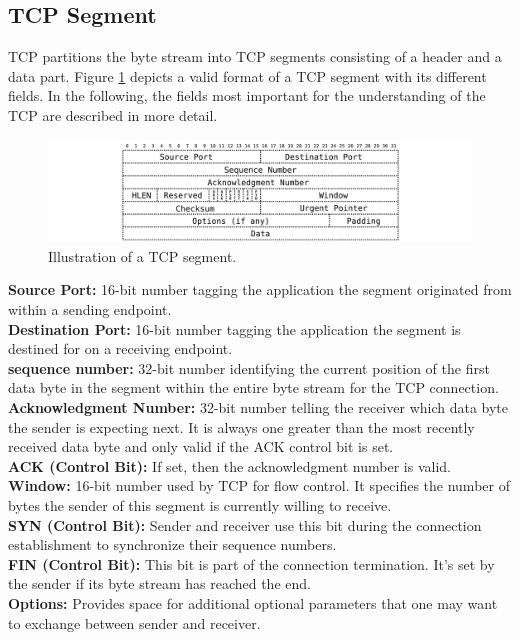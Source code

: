 \subsection*{TCP Segment}

TCP partitions the byte stream into TCP segments consisting of a header and a data part. Figure \ref{fig:TCPSegment} depicts a valid format of a TCP segment with its different fields. In the following, the fields most important for the understanding of the TCP are described in more detail. 

\begin{figure} [H]
	\begin{center}
		\def\svgwidth{1\textwidth}
		\includegraphics[scale=0.2]{../illustrations/importantConcepts/TCPSegment.pdf}  
		\caption[Caption for the list of figures.]{Illustration of a TCP segment.}
		\label{fig:TCPSegment}
	\end{center}
\end{figure}

{\small \textbf{Source Port:} 16-bit number tagging the application the segment originated from within a sending endpoint. \smallskip\\
\textbf{Destination Port:} 16-bit number tagging the application the segment is destined for on a receiving endpoint. \smallskip\\
\textbf{sequence number:} 32-bit number identifying the current position of the first data byte in the segment within the entire byte stream for the TCP connection. \smallskip\\
\textbf{Acknowledgment Number:} 32-bit number telling the receiver which data byte the sender is expecting next. It is always one greater than the most recently received data byte and only valid if the ACK control bit is set. \smallskip\\
\textbf{ACK (Control Bit):} If set, then the acknowledgment number is valid. \smallskip\\
\textbf{Window:} 16-bit number used by TCP for flow control. It specifies the number of bytes the sender of this segment is currently willing to receive. \smallskip\\
\textbf{SYN (Control Bit):} Sender and receiver use this bit during the connection establishment to synchronize their sequence numbers.  \smallskip\\
\textbf{FIN (Control Bit):} This bit is part of the connection termination. It's set by the sender if its byte stream has reached the end. \smallskip\\
\textbf{Options:} Provides space for additional optional parameters that one may want to exchange between sender and receiver. 
}
 
